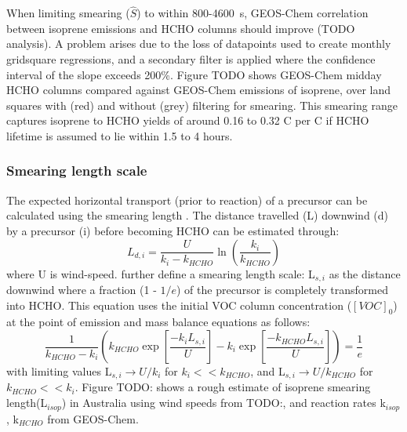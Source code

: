       
      
      When limiting smearing ($\hat{S}$) to within 800-4600~s, GEOS-Chem correlation between isoprene emissions and HCHO columns should improve (TODO analysis). 
      A problem arises due to the loss of datapoints used to create monthly gridsquare regressions, and a secondary filter is applied where the confidence interval of the slope exceeds 200\%.
      Figure TODO shows GEOS-Chem midday HCHO columns compared against GEOS-Chem emissions of isoprene, over land squares with (red) and without (grey) filtering for smearing.
      This smearing range captures isoprene to HCHO yields of around 0.16 to 0.32 C per C if HCHO lifetime is assumed to lie within 1.5 to 4 hours.
    
    \subsubsection{Smearing length scale}
    
      The expected horizontal transport (prior to reaction) of a precursor can be calculated using the smearing length \parencite{Palmer2003}.
      The distance travelled (L) downwind (d) by a precursor (i) before becoming HCHO can be estimated through:
      \begin{equation*}
        L_{d,i} = \frac{U}{k_i - k_{HCHO}} \ln{ \left( \frac{k_i}{k_{HCHO}} \right) }
      \end{equation*}
      where U is wind-speed.
      \textcite{Palmer2003} further define a smearing length scale: L$_{s,i}$ as the distance downwind where a fraction (1 - $1/e$) of the precursor is completely transformed into HCHO.
      This equation uses the initial VOC column concentration ($[VOC]_0$) at the point of emission and mass balance equations as follows:
      \begin{equation}
      \frac{1}{k_{HCHO}-k_i} \left( k_{HCHO} \exp{ \left[ \frac{-k_i L_{s,i}}{U} \right]} -k_i \exp{ \left[ \frac{-k_{HCHO} L_{s,i}}{U} \right]} \right) = \frac{1}{e} 
      \end{equation}
      with limiting values L$_{s,i} \rightarrow U/k_i$ for $k_i << k_{HCHO}$, and L$_{s,i} \rightarrow U/k_{HCHO}$ for $k_{HCHO} << k_i$.
      Figure TODO: shows a rough estimate of isoprene smearing length(L$_{isop}$) in Australia using wind speeds from TODO:, and reaction rates k$_{isop}$, k$_{HCHO}$ from GEOS-Chem.
      
